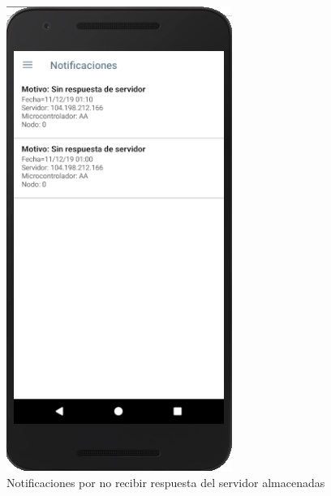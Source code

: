 \begin{figure}[H]
	\centering
	\includegraphics[scale=.7]{Capitulo5/images/muestra10.png}
	\caption{Notificaciones por no recibir respuesta del servidor almacenadas}	
	\label{fig:muestra 10}
\end{figure} 

